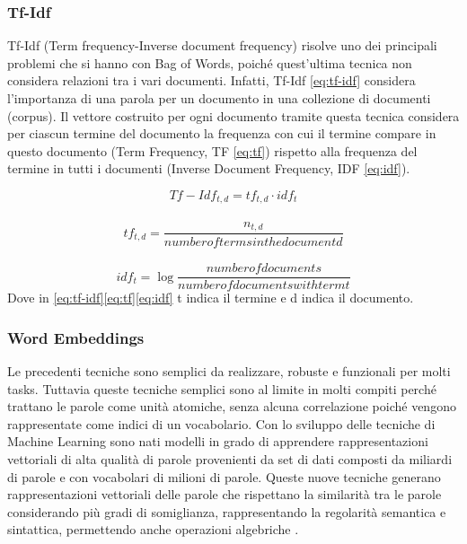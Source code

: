 \subsubsection{Tf-Idf}\label{section-tfidf}
Tf-Idf (Term frequency-Inverse document frequency) \cite{tfidf2008} risolve uno dei principali problemi che si hanno con Bag of Words, poiché quest'ultima tecnica non considera relazioni tra i vari documenti. Infatti, Tf-Idf \eqref{eq:tf-idf} considera l'importanza di una parola per un documento in una collezione di documenti (corpus).
Il vettore costruito per ogni documento tramite questa tecnica considera per ciascun termine del documento la frequenza con cui il termine compare in questo documento (Term Frequency, TF \eqref{eq:tf}) rispetto alla frequenza del termine in tutti i documenti (Inverse Document Frequency, IDF \eqref{eq:idf}).

\begin{equation}
\label{eq:tf-idf}
   Tf-Idf_{t,d} = tf_{t,d} \cdot idf_t
\end{equation}\\
\begin{equation}
\label{eq:tf}
   tf_{t,d} = \frac{n_{t,d}}{number of terms in the document d} 
\end{equation}\\
\begin{equation}
\label{eq:idf}
   idf_{t} = \log \frac{number of documents}{number of documents with term t} 
\end{equation}
Dove in \eqref{eq:tf-idf}\eqref{eq:tf}\eqref{eq:idf} t indica il termine e d indica il documento.
\\
\subsubsection{Word Embeddings}
Le precedenti tecniche sono semplici da realizzare, robuste e funzionali per molti tasks. Tuttavia queste tecniche semplici sono al limite in molti compiti perché trattano le parole come unità atomiche, senza alcuna correlazione poiché vengono rappresentate come indici di un vocabolario. 
Con lo sviluppo delle tecniche di Machine Learning sono nati modelli in grado di apprendere rappresentazioni vettoriali di alta qualità di parole provenienti da set di dati composti da miliardi di parole e con vocabolari di milioni di parole. Queste nuove tecniche generano rappresentazioni vettoriali delle parole che rispettano la similarità tra le parole considerando più gradi di somiglianza, rappresentando la regolarità semantica e sintattica, permettendo anche operazioni algebriche \cite{mikolov2013efficient}.
